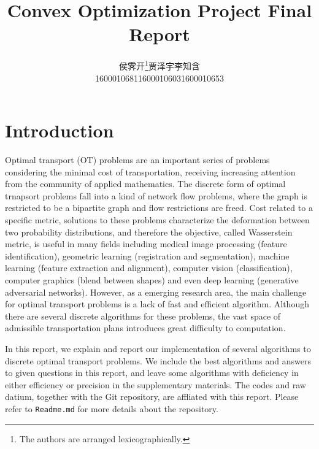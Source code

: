 \documentclass[english]{pkupaper}
\newcommand{\titlemark}{Convex Optimization Project Final Report}
\begin{document}
\DeclareRobustCommand{\authorthing}{%
\begin{tabular}{ccc}%
侯霁开\thanks{The authors are arranged lexicographically.} & 贾泽宇\thanksmark{1} & 李知含\thanksmark{1}\\%
1600010681 & 1600010603 & 1600010653%
\end{tabular}%
}
\title{\titlemark}
\author{\authorthing}

\maketitle

\section{Introduction}

Optimal transport (OT) problems are an important series of problems considering the minimal cost of transportation, receiving increasing attention from the community of applied mathematics. The discrete form of optimal trnapsort problems fall into a kind of network flow problems, where the graph is restricted to be a bipartite graph and flow restrictions are freed. Cost related to a specific metric, solutions to these problems characterize the deformation between two probability distributions, and therefore the objective, called Wasserstein metric, is useful in many fields including medical image processing (feature identification), geometric learning (registration and segmentation), machine learning (feature extraction and alignment), computer vision (classification), computer graphics (blend between shapes) and even deep learning (generative adversarial networks). However, as a emerging research area, the main challenge for optimal transport problems is a lack of fast and efficient algorithm. Although there are several discrete algorithms \parencite{Bertsekas1992} \parencite{Schrieber2017} for these problems, the vast space of admissible transportation plans introduces great difficulty to computation.

In this report, we explain and report our implementation of several algorithms to discrete optimal transport problems. We include the best algorithms and answers to given questions in this report, and leave some algorithms with deficiency in either efficiency or precision in the supplementary materials. The codes and raw datium, together with the Git repository, are affliated with this report. Please refer to \verb"Readme.md" for more details about the repository.
\end{document}
